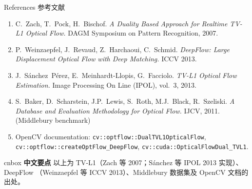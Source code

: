 \documentclass[aspectratio=169,10pt]{beamer}
\newcommand{\zh}[1]{{\zhfont #1}}
\newenvironment{cn}{%
  \begin{beamercolorbox}[rounded=true,sep=4pt,wd=\textwidth]{cnbox}\zhfont\footnotesize
  {\color{cblue!70!black}\textbf{中文要点}}\quad}%
  {\end{beamercolorbox}}
\begin{document}
\begin{frame}{References \zh{参考文献}}
  \small
  \begin{enumerate}\itemsep4pt
    \item C.~Zach, T.~Pock, H.~Bischof.
      \emph{A Duality Based Approach for Realtime TV-L1 Optical Flow.}
      DAGM Symposium on Pattern Recognition, 2007.
    \item P.~Weinzaepfel, J.~Revaud, Z.~Harchaoui, C.~Schmid.
      \emph{DeepFlow: Large Displacement Optical Flow with Deep Matching.}
      ICCV 2013.
    \item J.~S\'anchez~P\'erez, E.~Meinhardt-Llopis, G.~Facciolo.
      \emph{TV-L1 Optical Flow Estimation.}
      Image Processing On Line (IPOL), vol.~3, 2013.
    \item S.~Baker, D.~Scharstein, J.P.~Lewis, S.~Roth, M.J.~Black, R.~Szeliski.
      \emph{A Database and Evaluation Methodology for Optical Flow.}
      IJCV, 2011. (Middlebury benchmark)
    \item OpenCV documentation:
      \texttt{cv::optflow::DualTVL1OpticalFlow},
      \texttt{cv::optflow::createOptFlow\_DeepFlow},
      \texttt{cv::cuda::OpticalFlowDual\_TVL1}.
  \end{enumerate}
  \vfill
  \begin{cn}
    以上为 TV-L1（Zach 等 2007；S\'anchez 等 IPOL 2013 实现）、DeepFlow
    （Weinzaepfel 等 ICCV 2013）、Middlebury 数据集及 OpenCV 文档的出处。
  \end{cn}
\end{frame}
\end{document}
